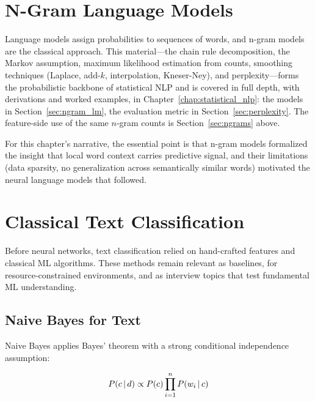 \section{N-Gram Language Models}
\label{sec:ngram_forward}

Language models assign probabilities to sequences of words, and n-gram models are the
classical approach. This material---the chain rule decomposition, the Markov assumption,
maximum likelihood estimation from counts, smoothing techniques (Laplace, add-$k$,
interpolation, Kneser-Ney), and perplexity---forms the probabilistic backbone of
statistical NLP and is covered in full depth, with derivations and worked examples, in
Chapter~\ref{chap:statistical_nlp}: the models in Section~\ref{sec:ngram_lm}, the
evaluation metric in Section~\ref{sec:perplexity}. The feature-side use of the same
$n$-gram counts is Section~\ref{sec:ngrams} above.

For this chapter's narrative, the essential point is that n-gram models formalized the
insight that local word context carries predictive signal, and their limitations (data
sparsity, no generalization across semantically similar words) motivated the neural
language models that followed.

\section{Classical Text Classification}
\label{sec:classical_classification}

Before neural networks, text classification relied on hand-crafted features and classical
ML algorithms. These methods remain relevant as baselines, for resource-constrained
environments, and as interview topics that test fundamental ML understanding.

\subsection{Naive Bayes for Text}
\label{sec:naive_bayes}

Naive Bayes applies Bayes' theorem with a strong conditional independence assumption:

\begin{equation}
    P(c \,|\, d) \propto P(c) \prod_{i=1}^{n} P(w_i \,|\, c)
    \label{eq:naive_bayes}
\end{equation}

